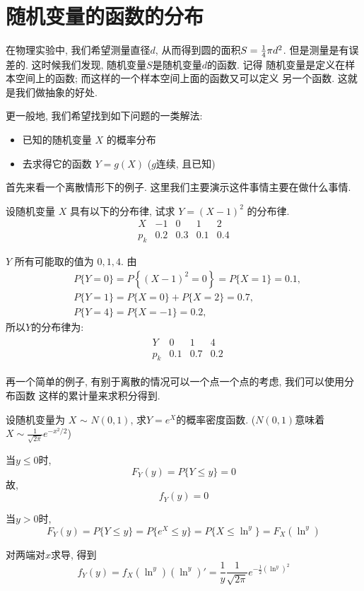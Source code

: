 \section{随机变量的函数的分布}

在物理实验中, 我们希望测量直径$d$, 从而得到圆的面积$S={1\over4} \pi d^2$. 
但是测量是有误差的. 这时候我们发现, 随机变量$S$是随机变量$d$的函数. 记得
随机变量是定义在样本空间上的函数; 而这样的一个样本空间上面的函数又可以定义
另一个函数. 这就是我们做抽象的好处. 

更一般地, 我们希望找到如下问题的一类解法: 
\begin{itemize}
    \item 已知的随机变量 $X$ 的概率分布
    \item 去求得它的函数 $Y=g(X)$ ($g$连续, 且已知)
\end{itemize}

首先来看一个离散情形下的例子. 这里我们主要演示这件事情主要在做什么事情. 

\begin{example}
  设随机变量 $X$ 具有以下的分布律, 试求 $Y=(X-1)^2$ 的分布律.
  $$
\begin{array}{c|cccc}
X & -1 & 0 & 1 & 2 \\
\hline p_k & 0.2 & 0.3 & 0.1 & 0.4
\end{array}
$$
\end{example}

\begin{solution}
  $Y$ 所有可能取的值为 $0,1,4$. 由
$$
\begin{aligned}
& P\{Y=0\}=P\left\{(X-1)^2=0\right\}=P\{X=1\}=0.1, \\
& P\{Y=1\}=P\{X=0\}+P\{X=2\}=0.7, \\
& P\{Y=4\}=P\{X=-1\}=0.2,
\end{aligned}
$$
所以$Y$的分布律为: 
$$
\begin{aligned}
&\begin{array}{c|ccc}
Y & 0 & 1 & 4 \\
\hline p_k & 0.1 & 0.7 & 0.2
\end{array}
\end{aligned}
$$
\end{solution}

再一个简单的例子, 有别于离散的情况可以一个点一个点的考虑, 我们可以使用分布函数
这样的累计量来求积分得到.  

\begin{example}
  设随机变量为 $X$ $\sim$ $N (0, 1)$, 求$Y = e^{X}$的概率密度函数. 
  ($N(0,1)$意味着$X\sim \frac1{\sqrt{2\pi}}e^{-x^2/2}$)
\end{example}
\begin{solution}
  当$y \leq 0$时,
  \[F_Y(y) = P\{Y \leq y\} = 0\]
  \quad 故,
  \[f_Y(y) = 0\]
  
  
  \quad 当$y > 0$时,
  \[F_Y(y) = P\{Y \leq y\} = P\{ e^{X} \leq y\} = P\{X \leq \ln^{y}\}= F_X(\ln^{y})\]
  
  \quad 对两端对$x$求导, 得到
  \[f_Y(y) = f_X(\ln^{y})(\ln^{y})' = \frac{1}{y}\frac{1}{\sqrt{2\pi}}e^{-\frac{1}{2}(\ln^y)^2}\]

\end{solution}

